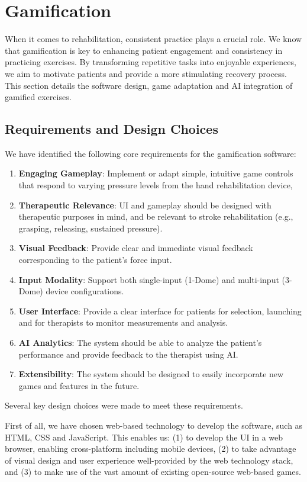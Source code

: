 \section{Gamification}

When it comes to rehabilitation, consistent practice plays a crucial role. 
We know that gamification is key to enhancing patient engagement and consistency in practicing exercises.
By transforming repetitive tasks into enjoyable experiences, 
we aim to motivate patients and provide a more stimulating recovery process. 
This section details the software design, game adaptation and AI integration of gamified exercises.

\subsection{Requirements and Design Choices}
We have identified the following core requirements for the gamification software:
\begin{enumerate}
    \item \textbf{Engaging Gameplay}: Implement or adapt simple, intuitive game controls 
    that respond to varying pressure levels from the hand rehabilitation device,
    \item \textbf{Therapeutic Relevance}: UI and gameplay should be designed with therapeutic purposes in mind, 
    and be relevant to stroke rehabilitation (e.g., grasping, releasing, sustained pressure).
    \item \textbf{Visual Feedback}: Provide clear and immediate visual feedback corresponding to the patient's force input. 
    \item \textbf{Input Modality}: Support both single-input (1-Dome) and multi-input (3-Dome) device configurations.
    \item \textbf{User Interface}: Provide a clear interface for patients for selection, launching and for therapists to monitor measurements and analysis.
    \item \textbf{AI Analytics}: The system should be able to analyze the patient's performance and provide feedback to the therapist using AI.
    \item \textbf{Extensibility}: The system should be designed to easily incorporate new games and features in the future.
\end{enumerate}

Several key design choices were made to meet these requirements.

First of all, we have chosen web-based technology to develop the software, such as HTML, CSS and JavaScript. 
This enables us: (1) to develop the UI in a web browser, enabling cross-platform including mobile devices,
(2) to take advantage of visual design and user experience well-provided by the web technology stack, and
(3) to make use of the vast amount of existing open-source web-based games.

